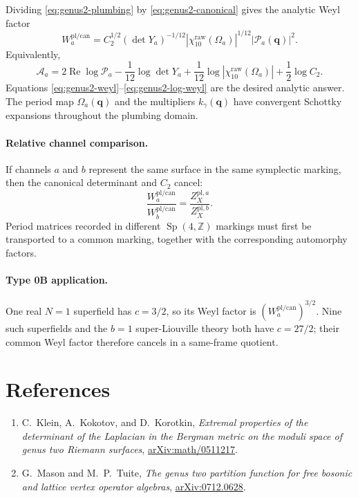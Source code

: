 \documentclass[11pt]{article}
\newcommand{\cP}{\mathcal P}
\newcommand{\cA}{\mathcal A}
\newcommand{\pl}{\mathrm{pl}}
\newcommand{\can}{\mathrm{can}}
\begin{document}
Dividing \eqref{eq:genus2-plumbing} by
\eqref{eq:genus2-canonical} gives the analytic Weyl factor
\begin{equation}
 \boxed{
 W_a^{\pl/\can}
 =C_2^{1/2}(\det Y_a)^{-1/12}
  |\chi_{10}^{\mathrm{raw}}(\Omega_a)|^{1/12}
  |\cP_a(\mathbf q)|^2.}
 \label{eq:genus2-weyl}
\end{equation}
Equivalently,
\begin{equation}
 \boxed{
 \cA_a
 =2\operatorname{Re}\log\cP_a
 -\frac{1}{12}\log\det Y_a
 +\frac{1}{12}\log|\chi_{10}^{\mathrm{raw}}(\Omega_a)|
 +\frac{1}{2}\log C_2.}
 \label{eq:genus2-log-weyl}
\end{equation}
Equations \eqref{eq:genus2-weyl}--\eqref{eq:genus2-log-weyl} are the desired
analytic answer.  The period map $\Omega_a(\mathbf q)$ and the multipliers
$k_\gamma(\mathbf q)$ have convergent Schottky expansions throughout the
plumbing domain.

\paragraph{Relative channel comparison.}
If channels $a$ and $b$ represent the same surface in the same symplectic
marking, then the canonical determinant and $C_2$ cancel:
\begin{equation}
 \frac{W_a^{\pl/\can}}{W_b^{\pl/\can}}
 =\frac{Z_X^{\pl,a}}{Z_X^{\pl,b}}.
 \label{eq:relative-channel}
\end{equation}
Period matrices recorded in different $\operatorname{Sp}(4,\mathbb Z)$
markings must first be transported to a common marking, together with the
corresponding automorphy factors.

\paragraph{Type 0B application.}
One real $N=1$ superfield has $c=3/2$, so its Weyl factor is
$(W_a^{\pl/\can})^{3/2}$.  Nine such superfields and the $b=1$
super-Liouville theory both have $c=27/2$; their common Weyl factor therefore
cancels in a same-frame quotient.

\section*{References}

\begin{enumerate}
 \item C.~Klein, A.~Kokotov, and D.~Korotkin,
 \emph{Extremal properties of the determinant of the Laplacian in the
 Bergman metric on the moduli space of genus two Riemann surfaces},
 \href{https://arxiv.org/abs/math/0511217}{arXiv:math/0511217}.
 \item G.~Mason and M.~P.~Tuite,
 \emph{The genus two partition function for free bosonic and lattice vertex
 operator algebras},
 \href{https://arxiv.org/abs/0712.0628}{arXiv:0712.0628}.
\end{enumerate}
\end{document}
